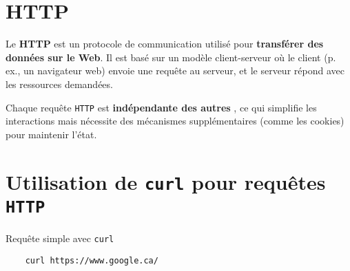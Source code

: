 \documentclass[a4paper]{report}
\begin{document}
    \section{HTTP}


    \begin{Concept}
        Le \textbf{HTTP}  est un protocole 
        de communication utilisé pour \textbf{transférer des données sur le Web}. Il est 
        basé sur un modèle client-serveur où le client (p. ex., un navigateur 
        web) envoie une requête au serveur, et le serveur répond avec les 
        ressources demandées. 
    \end{Concept}

    \begin{center}
    \end{center}

    \normalfont

    \begin{note}{}{}
        Chaque requête \texttt{HTTP}  est \textbf{indépendante des autres}  , 
                  ce qui simplifie les interactions mais nécessite des mécanismes 
                  supplémentaires (comme les cookies) pour maintenir l'état.
    \end{note}



    \section{Utilisation de \texttt{curl} pour requêtes \texttt{HTTP}  }

    \begin{EExample}{Requête simple avec \texttt{curl}}{}
        \begin{lstlisting}
    curl https://www.google.ca/
        \end{lstlisting}
        \begin{center}
            \hyperlink{Requête simple avec curl}{
            }
        \end{center}
    \end{EExample}
\end{document}
